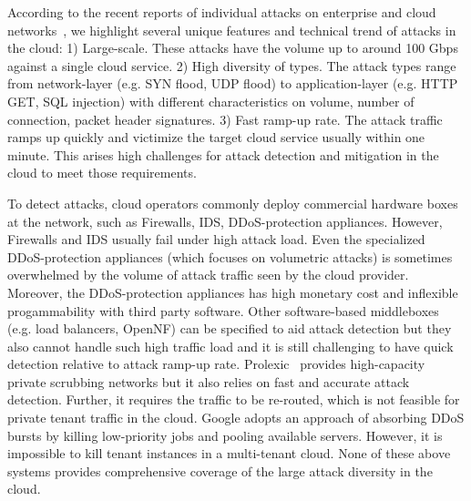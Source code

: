 According to the recent reports of individual attacks on enterprise and cloud
 networks~\cite{googlesecurityreport,Prolexic}, we highlight several unique features and technical trend
 of attacks in the cloud:
 1) Large-scale. These attacks have 
 the volume up to around 100 Gbps against a single cloud service. 
 2) High diversity of types. The attack types range from network-layer (e.g. SYN flood, UDP flood) to
 application-layer (e.g. HTTP GET, SQL injection) with different characteristics on volume, number of connection, packet header signatures. 
 3) Fast ramp-up rate. The attack traffic ramps up quickly and victimize the target cloud service usually within one minute.
This arises high challenges for attack detection and mitigation in the cloud to meet those requirements.

To detect attacks, cloud operators commonly deploy
commercial hardware boxes at the network, such as Firewalls, IDS, DDoS-protection appliances. 
However, Firewalls and IDS usually fail under high attack load. Even the specialized DDoS-protection appliances
(which focuses on volumetric attacks) is sometimes overwhelmed by the volume of attack
traffic seen by the cloud provider. Moreover, the DDoS-protection appliances has high monetary cost and inflexible progammability with third party software. Other software-based middleboxes (e.g. load balancers, OpenNF) can be specified to aid attack detection but they also cannot handle such high traffic load and it is still challenging to have quick detection relative to attack ramp-up rate. 
%
Prolexic~\cite{Prolexic} provides high-capacity private scrubbing networks but it also relies on fast and accurate attack detection. Further, it requires the traffic to be re-routed, which is not feasible for private tenant traffic in the cloud.
%
Google adopts an approach of absorbing DDoS bursts by killing low-priority jobs and pooling available servers. However, it is impossible to kill tenant instances in a multi-tenant cloud. 
%
None of these above systems provides comprehensive
coverage of the large attack diversity in the cloud. 

